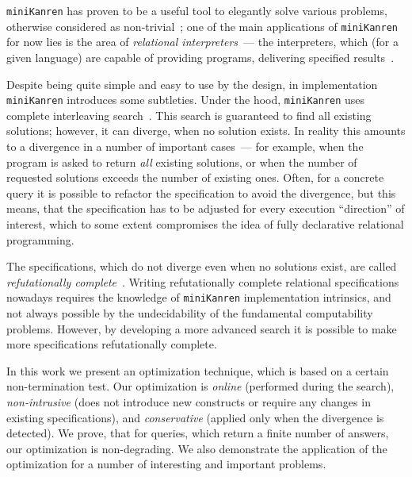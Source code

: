 \documentclass[preprint,numbers,10pt]{sigplanconf}
\newcommand{\miniKanren}{\texttt{miniKanren}\xspace}
\begin{document}
\miniKanren has proven to be a useful tool to elegantly solve various problems, otherwise considered as non-trivial~\cite{WillThesis};
one of the main applications of \miniKanren for now lies is the area of \emph{relational interpreters}~--- the interpreters, which (for a given language)
are capable of providing programs, delivering specified results~\cite{Untagged}.

Despite being quite simple and easy to use by the design, in implementation \miniKanren introduces some subtleties. Under the hood, \miniKanren 
uses complete interleaving search~\cite{Search}. This search is guaranteed to find all existing solutions; however, it can diverge, when no 
solution exists. In reality this amounts to a divergence in a number of important cases~--- for example, when the program is asked to 
return \emph{all} existing solutions, or when the number of requested solutions exceeds the number of existing ones. Often, for a 
concrete query it is possible to refactor the specification to avoid the divergence, but this means, that the specification has to be adjusted for every 
execution ``direction'' of interest, which to some extent compromises the idea of fully declarative relational programming. 

The specifications, which do not diverge even when no solutions exist, are called \emph{refutationally complete}~\cite{WillThesis}. Writing 
refutationally complete relational specifications nowadays requires the knowledge of \miniKanren implementation intrinsics, and not always
possible by the undecidability of the fundamental computability problems. However, by developing a more advanced search it is possible
to make more specifications refutationally complete.

In this work we present an optimization technique, which is based on a certain non-termination test. Our optimization is \emph{online} (performed during the
search), \emph{non-intrusive} (does not introduce new constructs or require any changes in existing specifications), and \emph{conservative} 
(applied only when the divergence is detected). We prove, that for queries, which return a finite number of answers, our optimization is non-degrading. 
We also demonstrate the application of the optimization for a number of interesting and important problems.
\end{document}
